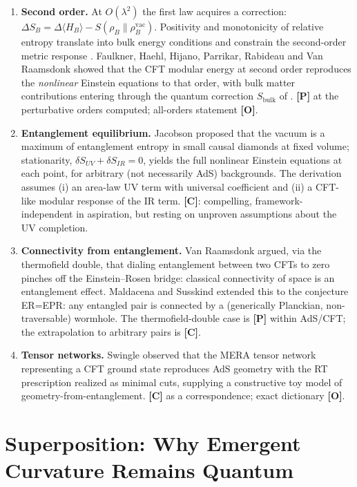 \documentclass[11pt]{article}
\theoremstyle{definition}
\newcommand{\pP}{\textbf{[P]}}
\newcommand{\pC}{\textbf{[C]}}
\newcommand{\pO}{\textbf{[O]}}
\begin{document}
\begin{enumerate}[itemsep=2pt]
\item \textbf{Second order.} At $O(\lambda^2)$ the first law acquires a
correction: $\Delta S_B=\Delta\langle H_B\rangle-S(\rho_B\|\rho_B^{\mathrm{vac}})$.
Positivity and monotonicity of relative entropy translate into bulk energy
conditions and constrain the second-order metric response
\cite{BlancoCasini2013,Lashkari2014}. Faulkner, Haehl, Hijano, Parrikar,
Rabideau and Van Raamsdonk \cite{Faulkner2017} showed that the CFT modular
energy at second order reproduces the \emph{nonlinear} Einstein equations to
that order, with bulk matter contributions entering through the quantum
correction $S_{\mathrm{bulk}}$ of \cite{FLM2013}. \pP{} at the perturbative
orders computed; all-orders statement \pO{}.
\item \textbf{Entanglement equilibrium.} Jacobson \cite{Jacobson2016} proposed
that the vacuum is a maximum of entanglement entropy in small causal diamonds
at fixed volume; stationarity, $\delta S_{UV}+\delta S_{IR}=0$, yields the
full nonlinear Einstein equations at each point, for arbitrary (not
necessarily AdS) backgrounds. The derivation assumes (i) an area-law UV term
with universal coefficient and (ii) a CFT-like modular response of the IR
term. \pC{}: compelling, framework-independent in aspiration, but resting on
unproven assumptions about the UV completion.
\item \textbf{Connectivity from entanglement.} Van Raamsdonk
\cite{VanRaamsdonk2010} argued, via the thermofield double, that dialing
entanglement between two CFTs to zero pinches off the Einstein--Rosen bridge:
classical connectivity of space is an entanglement effect. Maldacena and
Susskind \cite{MaldacenaSusskind2013} extended this to the conjecture ER=EPR:
any entangled pair is connected by a (generically Planckian, non-traversable)
wormhole. The thermofield-double case is \pP{} within AdS/CFT; the
extrapolation to arbitrary pairs is \pC{}.
\item \textbf{Tensor networks.} Swingle \cite{Swingle2012} observed that the
MERA tensor network representing a CFT ground state reproduces AdS geometry
with the RT prescription realized as minimal cuts, supplying a constructive
toy model of geometry-from-entanglement. \pC{} as a correspondence; exact
dictionary \pO{}.
\end{enumerate}

\section{Superposition: Why Emergent Curvature Remains Quantum}
\label{sec:superposition}
\end{document}
